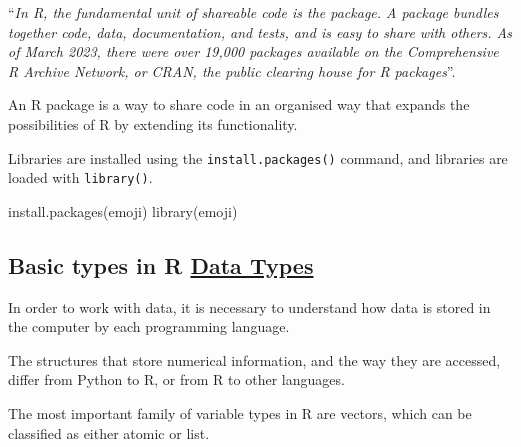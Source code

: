 \documentclass[
  letterpaper,
  DIV=11,
  numbers=noendperiod]{scrartcl}
\newenvironment{Shaded}{\begin{snugshade}}{\end{snugshade}}
\newcommand{\FunctionTok}[1]{\textcolor[rgb]{0.28,0.35,0.67}{#1}}
\newcommand{\NormalTok}[1]{\textcolor[rgb]{0.00,0.23,0.31}{#1}}
\begin{document}
``\emph{In R, the fundamental unit of shareable code is the package. A
package bundles together code, data, documentation, and tests, and is
easy to share with others. As of March 2023, there were over 19,000
packages available on the Comprehensive R Archive Network, or CRAN, the
public clearing house for R packages}''.

An R package is a way to share code in an organised way that expands the
possibilities of R by extending its functionality.

Libraries are installed using the \texttt{install.packages()} command,
and libraries are loaded with \texttt{library()}.

\begin{Shaded}
\begin{Highlighting}[]
\FunctionTok{install.packages}\NormalTok{(emoji)}
\FunctionTok{library}\NormalTok{(emoji)}
\end{Highlighting}
\end{Shaded}

\hypertarget{basic-types-in-r-data-types}{%
\subsection{\texorpdfstring{Basic types in R
\href{http://www.statmethods.net/input/datatypes.html}{Data
Types}}{Basic types in R Data Types}}\label{basic-types-in-r-data-types}}

In order to work with data, it is necessary to understand how data is
stored in the computer by each programming language.

The structures that store numerical information, and the way they are
accessed, differ from Python to R, or from R to other languages.

The most important family of variable types in R are vectors, which can
be classified as either atomic or list.
\end{document}
